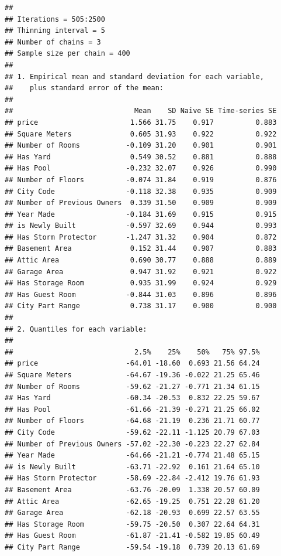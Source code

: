 \documentclass[
]{article}
\begin{document}
\begin{verbatim}
## 
## Iterations = 505:2500
## Thinning interval = 5 
## Number of chains = 3 
## Sample size per chain = 400 
## 
## 1. Empirical mean and standard deviation for each variable,
##    plus standard error of the mean:
## 
##                             Mean    SD Naive SE Time-series SE
## price                      1.566 31.75    0.917          0.883
## Square Meters              0.605 31.93    0.922          0.922
## Number of Rooms           -0.109 31.20    0.901          0.901
## Has Yard                   0.549 30.52    0.881          0.888
## Has Pool                  -0.232 32.07    0.926          0.990
## Number of Floors          -0.074 31.84    0.919          0.876
## City Code                 -0.118 32.38    0.935          0.909
## Number of Previous Owners  0.339 31.50    0.909          0.909
## Year Made                 -0.184 31.69    0.915          0.915
## is Newly Built            -0.597 32.69    0.944          0.993
## Has Storm Protector       -1.247 31.32    0.904          0.872
## Basement Area              0.152 31.44    0.907          0.883
## Attic Area                 0.690 30.77    0.888          0.889
## Garage Area                0.947 31.92    0.921          0.922
## Has Storage Room           0.935 31.99    0.924          0.929
## Has Guest Room            -0.844 31.03    0.896          0.896
## City Part Range            0.738 31.17    0.900          0.900
## 
## 2. Quantiles for each variable:
## 
##                             2.5%    25%    50%   75% 97.5%
## price                     -64.01 -18.60  0.693 21.56 64.24
## Square Meters             -64.67 -19.36 -0.022 21.25 65.46
## Number of Rooms           -59.62 -21.27 -0.771 21.34 61.15
## Has Yard                  -60.34 -20.53  0.832 22.25 59.67
## Has Pool                  -61.66 -21.39 -0.271 21.25 66.02
## Number of Floors          -64.68 -21.19  0.236 21.71 60.77
## City Code                 -59.62 -22.11 -1.125 20.79 67.03
## Number of Previous Owners -57.02 -22.30 -0.223 22.27 62.84
## Year Made                 -64.66 -21.21 -0.774 21.48 65.15
## is Newly Built            -63.71 -22.92  0.161 21.64 65.10
## Has Storm Protector       -58.69 -22.84 -2.412 19.76 61.93
## Basement Area             -63.76 -20.09  1.338 20.57 60.09
## Attic Area                -62.65 -19.25  0.751 22.28 61.20
## Garage Area               -62.18 -20.93  0.699 22.57 63.55
## Has Storage Room          -59.75 -20.50  0.307 22.64 64.31
## Has Guest Room            -61.87 -21.41 -0.582 19.85 60.49
## City Part Range           -59.54 -19.18  0.739 20.13 61.69
\end{verbatim}
\end{document}
